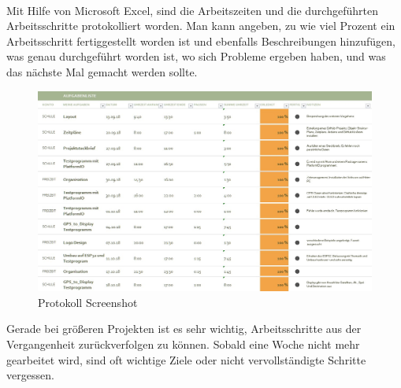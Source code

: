         \ \\ Mit Hilfe von Microsoft Excel, sind die Arbeitszeiten und die durchgeführten Arbeitsschritte protokolliert worden. Man kann angeben, zu wie viel Prozent ein Arbeitsschritt fertiggestellt worden ist und ebenfalls Beschreibungen hinzufügen, was genau durchgeführt worden ist, wo sich Probleme ergeben haben, und was das nächste Mal gemacht werden sollte.
    
        \begin{figure}[H]
            \centering
            \includegraphics[width=1\textwidth]{./media/images/Excel.jpg}
            \caption{Protokoll Screenshot}
            \label{fig:Protokoll}
        \end{figure}
        
        Gerade bei größeren Projekten ist es sehr wichtig, Arbeitsschritte aus der Vergangenheit zurückverfolgen zu können. Sobald eine Woche nicht mehr gearbeitet wird, sind oft wichtige Ziele oder nicht vervollständigte Schritte vergessen. 
        
\pagebreak
        
